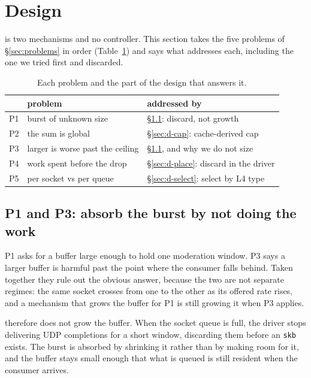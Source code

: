 \section{Design}
\label{sec:design}

\sys is two mechanisms and no controller. This section takes the five problems
of \S\ref{sec:problems} in order (Table~\ref{tab:map}) and says what addresses
each, including the one we tried first and discarded.

\begin{table}[t]
\centering
\small
\begin{tabular}{@{}llp{3.1cm}@{}}
\toprule
 & problem & addressed by \\
\midrule
P1 & burst of unknown size & \S\ref{sec:d-burst}: discard, not growth \\
P2 & the sum is global & \S\ref{sec:d-cap}: cache-derived cap \\
P3 & larger is worse past the ceiling & \S\ref{sec:d-burst}, and why we do not size \\
P4 & work spent before the drop & \S\ref{sec:d-place}: discard in the driver \\
P5 & per socket vs per queue & \S\ref{sec:d-select}: select by L4 type \\
\bottomrule
\end{tabular}
\caption{Each problem and the part of the design that answers it.}
\label{tab:map}
\end{table}

\subsection{P1 and P3: absorb the burst by not doing the work}
\label{sec:d-burst}

P1 asks for a buffer large enough to hold one moderation window. P3 says a
larger buffer is harmful past the point where the consumer falls behind. Taken
together they rule out the obvious answer, because the two are not separate
regimes: the same socket crosses from one to the other as its offered rate
rises, and a mechanism that grows the buffer for P1 is still growing it when P3
applies.

\sys therefore does not grow the buffer. When the socket queue is full, the
driver stops delivering UDP completions for a short window, discarding them
before an \texttt{skb} exists. The burst is absorbed by shrinking it rather than
by making room for it, and the buffer stays small enough that what is queued is
still resident when the consumer arrives.

